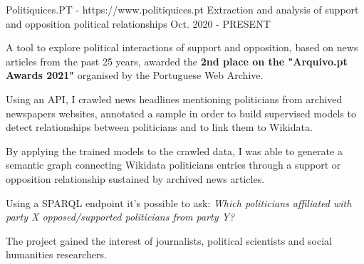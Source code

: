 

\begin{cventries}
  \cventry
    {Politiquices.PT - https://www.politiquices.pt} %
    {Extraction and analysis of support and opposition political relationships} %
    {} %
    {Oct. 2020 - PRESENT} %
    {
      \begin{cvitems} %
        \item {A tool to explore political interactions of support and opposition, based on news articles from the past 25 years, awarded the \textbf{2nd place on the "Arquivo.pt Awards 2021"} organised by the Portuguese Web Archive.}
		\item {Using an API, I crawled news headlines mentioning politicians from archived newspapers websites, annotated a sample in order to build supervised models to detect relationships between politicians and to link them to Wikidata.}
		\item {By applying the trained models to the crawled data, I was able to generate a semantic graph connecting Wikidata politicians entries through a support or opposition relationship sustained by archived news articles.}
		\item {Using a SPARQL endpoint it's possible to ask: \textit{Which politicians affiliated with party X opposed/supported politicians from party Y?}}
		\item {The project gained the interest of journalists, political scientists and social humanities researchers.}
      \end{cvitems}
    }
\end{cventries}